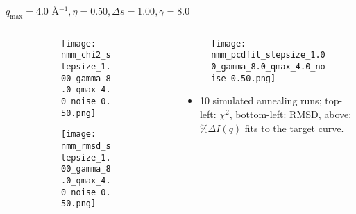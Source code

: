 \documentclass{beamer}
\begin{document}
\begin{frame}{$ q_{\textrm{max}}=4.0 $ \AA $^{-1}, \eta=0.50, \Delta s=1.00, \gamma=8.0$}
	\begin{columns}
		\begin{column}{.5\textwidth}
			\begin{figure}[H]
			\centering
			\begin{subfigure}[b]{\textwidth}
				\centering
				\texttt{[image: nmm\_chi2\_stepsize\_1.00\_gamma\_8.0\_qmax\_4.0\_noise\_0.50.png]}
				\label{fig:}
			\end{subfigure}
			\begin{subfigure}[b]{\textwidth}
				\centering
				\texttt{[image: nmm\_rmsd\_stepsize\_1.00\_gamma\_8.0\_qmax\_4.0\_noise\_0.50.png]}
				\label{fig:}
			\end{subfigure}
			\end{figure}
		\end{column}
		\begin{column}{.5\textwidth}
			\begin{figure}[H]
				\centering
				\texttt{[image: nmm\_pcdfit\_stepsize\_1.00\_gamma\_8.0\_qmax\_4.0\_noise\_0.50.png]}
				\label{fig:}
			\end{figure}
			\begin{itemize}
				\item 10 simulated annealing runs; top-left: $\chi^2$, bottom-left: RMSD, above: $\%\Delta I(q)$ fits to the target curve.
			\end{itemize}
		\end{column}
	\end{columns}
\end{frame}
 
\end{document}
